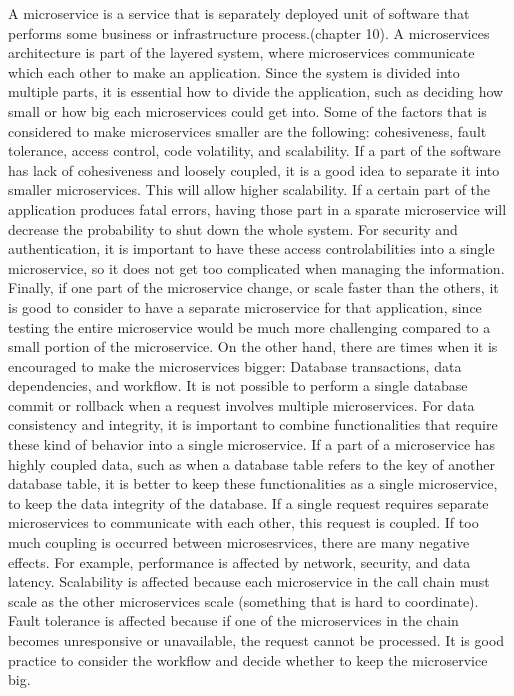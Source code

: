 A microservice is a service that is separately deployed unit of software that performs some business or infrastructure process.(chapter 10).
A microservices architecture is part of the layered system, where microservices communicate which each other to make an application. 
Since the system is divided into multiple parts, it is essential how to divide the application, 
such as deciding how small or how big each microservices could get into. Some of the factors that is considered to make microservices 
smaller are the following: cohesiveness, fault tolerance, access control, code volatility, and scalability. 
If a part of the software has lack of cohesiveness and loosely coupled, it is a good idea to separate it into smaller microservices. 
This will allow higher scalability. If a certain part of the application produces fatal errors, 
having those part in a sparate microservice will decrease the probability to shut down the whole system. 
For security and authentication, it is important to have these access controlabilities into a single microservice, 
so it does not get too complicated when managing the information. Finally, if one part of the microservice change, 
or scale faster than the others, it is good to consider to have a separate microservice for that application, 
since testing the entire microservice would be much more challenging compared to a small portion of the microservice. 
On the other hand, there are times when it is encouraged to make the microservices bigger: Database transactions, data dependencies, and workflow. 
It is not possible to perform a single database commit or rollback when a request involves multiple microservices. 
For data consistency and integrity, it is important to combine functionalities that require these kind of behavior into a single microservice. 
If a part of a microservice has highly coupled data, such as when a database table refers to  the key of another database table, 
it is better to keep these functionalities as a single microservice, to keep the data integrity of the database. 
If a single request requires separate microservices to communicate with each other, this request is coupled. 
If too much coupling is occurred between microsesrvices, there are many negative effects. 
For example, performance is affected by network, security, and data latency. 
Scalability is affected because each microservice in the call chain must scale as the other microservices scale (something that is hard to coordinate).
Fault tolerance is affected because if one of the microservices in the chain becomes unresponsive or unavailable, the request cannot be processed.
It is good practice to consider the workflow and decide whether to keep the microservice big.\\

